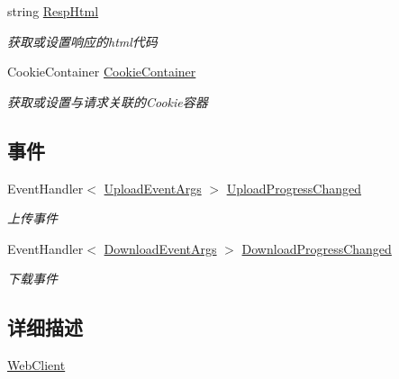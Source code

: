 \begin{DoxyCompactItemize}
string \hyperlink{class_x_c_l_net_tools_1_1_file_handler_1_1_web_client_a67e90e96bd067171c16cb84d75f66c3a}{Resp\-Html}
\begin{DoxyCompactList}\small\item\em 获取或设置响应的html代码 \end{DoxyCompactList}\item 
Cookie\-Container \hyperlink{class_x_c_l_net_tools_1_1_file_handler_1_1_web_client_adeaa1201074e43df3743d76ea77cf06e}{Cookie\-Container}
\begin{DoxyCompactList}\small\item\em 获取或设置与请求关联的\-Cookie容器 \end{DoxyCompactList}\end{DoxyCompactItemize}
\subsection*{事件}
\begin{DoxyCompactItemize}
\item 
Event\-Handler$<$ \hyperlink{class_x_c_l_net_tools_1_1_file_handler_1_1_upload_event_args}{Upload\-Event\-Args} $>$ \hyperlink{class_x_c_l_net_tools_1_1_file_handler_1_1_web_client_abe950fa329508b4c52e3181aeb97585f}{Upload\-Progress\-Changed}
\begin{DoxyCompactList}\small\item\em 上传事件 \end{DoxyCompactList}\item 
Event\-Handler$<$ \hyperlink{class_x_c_l_net_tools_1_1_file_handler_1_1_download_event_args}{Download\-Event\-Args} $>$ \hyperlink{class_x_c_l_net_tools_1_1_file_handler_1_1_web_client_aa1e50d608381b728356547eff9f80213}{Download\-Progress\-Changed}
\begin{DoxyCompactList}\small\item\em 下载事件 \end{DoxyCompactList}\end{DoxyCompactItemize}


\subsection{详细描述}
\hyperlink{class_x_c_l_net_tools_1_1_file_handler_1_1_web_client}{Web\-Client} 



